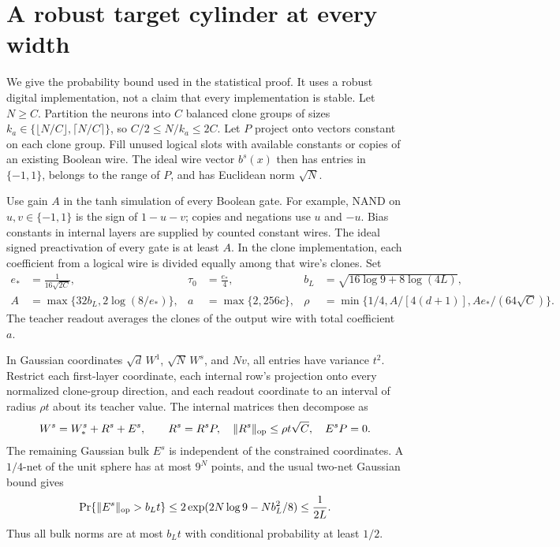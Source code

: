 \section{A robust target cylinder at every width}
\label{sec:theory-target-cylinder}

We give the probability bound used in the statistical proof. It uses a
robust digital implementation, not a claim that every implementation is
stable. Let $N\ge C$. Partition the neurons into $C$ balanced clone groups
of sizes $k_a\in\{\lfloor N/C\rfloor,\lceil N/C\rceil\}$, so
$C/2\le N/k_a\le2C$. Let $P$ project onto vectors constant on each clone
group. Fill unused logical slots with available constants or copies of an
existing Boolean wire. The ideal wire
vector $b^s(x)$ then has entries in $\{-1,1\}$, belongs to the range of
$P$, and has Euclidean norm $\sqrt N$.

Use gain $A$ in the tanh simulation of every Boolean gate. For example,
NAND on $u,v\in\{-1,1\}$ is the sign of $1-u-v$; copies and negations
use $u$ and $-u$. Bias constants in internal layers are supplied by counted
constant wires. The ideal signed preactivation of every gate is at least
$A$. In the clone implementation, each coefficient from a logical wire is
divided equally among that wire's clones. Set
\begin{align*}
 e_*&=\frac1{16\sqrt{2C}},&
 \tau_0&=\frac{e_*}{4},&
 b_L&=\sqrt{16\log9+8\log(4L)},\\
 A&=\max\{32b_L,2\log(8/e_*)\},&
 a&=\max\{2,256c\},&
 \rho&=\min\{1/4,A/[4(d+1)],Ae_*/(64\sqrt C)\}.
\end{align*}
The teacher readout averages the clones of the output wire with total
coefficient $a$.

In Gaussian coordinates $\sqrt d\,W^1$, $\sqrt N\,W^s$, and $Nv$, all
entries have variance $t^2$. Restrict each first-layer coordinate, each
internal row's projection onto every normalized clone-group direction, and
each readout coordinate to an interval of radius $\rho t$ about its teacher
value. The internal matrices then decompose as
\[
 W^s=W_*^s+R^s+E^s,\qquad
 R^s=R^sP,\quad \|R^s\|_{\rm op}\le\rho t\sqrt C,
 \quad E^sP=0.
\]
The remaining Gaussian bulk $E^s$ is independent of the constrained
coordinates. A $1/4$-net of the unit sphere has at most $9^N$ points,
and the usual two-net Gaussian bound gives
\[
 \Pr\{\|E^s\|_{\rm op}>b_Lt\}
 \le2\exp(2N\log9-Nb_L^2/8)\le\frac1{2L}.
\]
Thus all bulk norms are at most $b_Lt$ with conditional probability at
least $1/2$.

